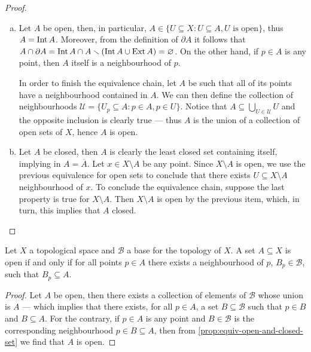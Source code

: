 \begin{proof}
\begin{enumerate}[(a)]\setlength\itemsep{0em}
\item Let \(A\) be open, then, in particular, \(A \in \{U \subseteq X
  : U \subseteq A, U \text{ is open}\}\), thus \(A = \operatorname{Int} A\). Moreover, from
  the definition of \(\partial A\) it follows that \(A \cap \partial A = \operatorname{Int} A
  \cap A \smallsetminus (\operatorname{Int} A \cup \operatorname{Ext} A) = \varnothing\). On the other hand, if \(p
  \in A\) is any point, then \(A\) itself is a neighbourhood of \(p\).

  In order to finish the equivalence chain, let \(A\) be such that all of its
  points have a neighbourhood contained in \(A\). We can then define the
  collection of neighbourhoods \(\mathcal U = \{U_p \subseteq A : p \in A, p \in
  U\}\). Notice that \(A \subseteq \bigcup_{U \in \mathcal U} U\) and the
  opposite inclusion is clearly true --- thus \(A\) is the union of a collection
  of open sets of \(X\), hence \(A\) is open.

\item Let \(A\) be closed, then \(A\) is clearly the least closed set containing
  itself, implying in \(A = \overline A\). Let \(x \in X \setminus A\) be any
  point. Since \(X \setminus A\) is open, we use the previous equivalence for
  open sets to conclude that there exists \(U \subseteq X \setminus A\)
  neighbourhood of \(x\).  To conclude the equivalence chain, suppose the last
  property is true for \(X \setminus A\). Then \(X \setminus A\) is open by the
  previous item, which, in turn, this implies that \(A\) closed.
\end{enumerate}
\end{proof}

\begin{proposition}
Let \(X\) a topological space and \(\mathcal B\) a base for the topology of
\(X\). A set \(A \subseteq X\) is open if and only if for all points \(p \in
A\) there exists a neighbourhood of \(p\), \(B_p \in \mathcal B\), such that
\(B_p \subseteq A\).
\end{proposition}

\begin{proof}
Let \(A\) be open, then there exists a collection of elements of \(\mathcal B\)
whose union is \(A\) --- which implies that there exists, for all \(p \in A\), a
set \(B \subseteq \mathcal B\) such that \(p \in B\) and \(B \subseteq
A\). For the contrary, if \(p \in A\) is any point and \(B \in \mathcal B\) is
the corresponding neighbourhood \(p \in B \subseteq A\), then from
\cref{prop:equiv-open-and-closed-set} we find that \(A\) is open.
\end{proof}


